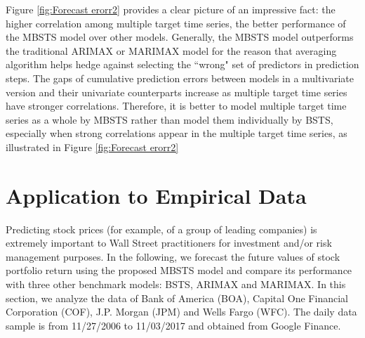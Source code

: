 \documentclass[twoside,11pt]{article}
\begin{document}
Figure \ref{fig:Forecast erorr2} provides a clear picture of an impressive fact: the higher correlation among multiple target time series, the better performance of the MBSTS model over other models. Generally, the MBSTS model outperforms the traditional ARIMAX or MARIMAX model for the reason that averaging algorithm helps hedge against selecting the ``wrong" set of predictors in prediction steps. The gaps of cumulative prediction errors between models in a multivariate version and their univariate counterparts increase as multiple target time series have stronger correlations. Therefore, it is better to model multiple target time series as a whole by MBSTS rather than model them individually by BSTS, especially when strong correlations appear in the multiple target time series, as illustrated in Figure \ref{fig:Forecast erorr2}


\section{Application to Empirical Data}
Predicting stock prices (for example, of a group of leading companies) is extremely important to Wall Street practitioners for investment and/or risk management purposes.
In the following, we forecast the future values of stock portfolio return using the proposed MBSTS model and compare its performance with three other benchmark models: BSTS, ARIMAX and MARIMAX.
In this section, we analyze the data of Bank of America (BOA), Capital One Financial Corporation (COF), J.P. Morgan (JPM) and Wells Fargo (WFC). The daily data sample is from 11/27/2006 to 11/03/2017 and obtained from Google Finance.
\end{document}
